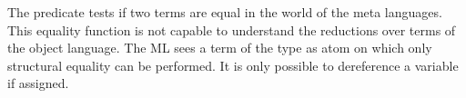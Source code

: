 \documentclass[sigconf,natbib=false]{acmart}
\begin{document}
The \eqho predicate tests if two terms are equal in the world of the meta
languages. This equality function is not capable to understand the \etabeta
reductions over terms of the object language. The ML sees a term of the type
 as atom on which only structural equality can be performed. It is
only possible to dereference a variable if assigned.
















\end{document}
